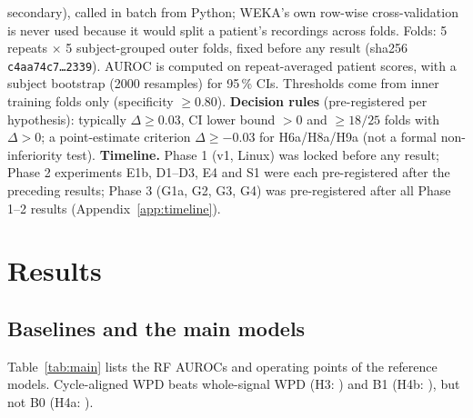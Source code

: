 \documentclass[conference]{IEEEtran}
\begin{document}
secondary), called in batch from Python; WEKA's own row-wise cross-validation is never used because it would split a
patient's recordings across folds. Folds: 5 repeats $\times$ 5 subject-grouped outer folds, fixed before any result
(sha256 \texttt{c4aa74c7\ldots2339}). AUROC is computed on repeat-averaged patient scores, with a subject bootstrap
(2000 resamples) for 95\,\% CIs. Thresholds come from inner training folds only (specificity $\geq 0.80$).
\textbf{Decision rules} (pre-registered per hypothesis): typically $\Delta \geq 0.03$, CI lower bound $>0$ and $\geq 18/25$
folds with $\Delta>0$; a point-estimate criterion $\Delta \geq -0.03$ for H6a/H8a/H9a (not a formal non-inferiority test). \textbf{Timeline.} Phase 1 (v1, Linux) was
locked before any result; Phase 2 experiments E1b, D1--D3, E4 and S1 were each pre-registered after the preceding results;
Phase 3 (G1a, G2, G3, G4) was pre-registered after all Phase 1--2 results (Appendix~\ref{app:timeline}).

\section{Results}
\subsection{Baselines and the main models}
Table~\ref{tab:main} lists the RF AUROCs and operating points of the reference models. Cycle-aligned WPD beats whole-signal
WPD (H3: ) and B1 (H4b: ), but not B0 (H4a: ).
\begin{table}[t]\centering\caption{Main models (RF, patient level; operating point: inner-fold threshold for specificity
$\geq 0.80$; W.acc = Challenge weighted accuracy at that threshold).}\label{tab:main}
\resizebox{\linewidth}{!}{}\end{table}
\end{document}
